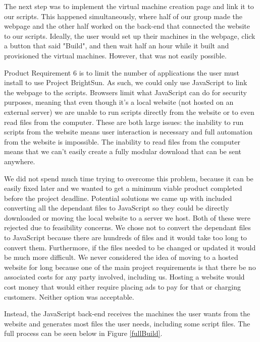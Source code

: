 \documentclass[openright]{report}
\begin{document}
\par The next step was to implement the virtual machine creation page and link it to our scripts. This happened simultaneously, where half of our group made the webpage and the other half worked on the back-end that connected the website to our scripts. Ideally, the user would set up their machines in the webpage, click a button that said "Build", and then wait half an hour while it built and provisioned the virtual machines. However, that was not easily possible.

\par Product Requirement 6 is to limit the number of applications the user must install to use Project BrightSun. As such, we could only use JavaScript to link the webpage to the scripts. Browsers limit what JavaScript can do for security purposes, meaning that even though it's a local website (not hosted on an external server) we are unable to run scripts directly from the website or to even read files from the computer. These are both large issues: the inability to run scripts from the website means user interaction is necessary and full automation from the website is impossible. The inability to read files from the computer means that we can't easily create a fully modular download that can be sent anywhere.

\par We did not spend much time trying to overcome this problem, because it can be easily fixed later and we wanted to get a minimum viable product completed before the project deadline. Potential solutions we came up with included converting all the dependant files to JavaScript so they could be directly downloaded or moving the local website to a server we host. Both of these were rejected due to feasibility concerns. We chose not to convert the dependant files to JavaScript because there are hundreds of files and it would take too long to convert them. Furthermore, if the files needed to be changed or updated it would be much more difficult. We never considered the idea of moving to a hosted website for long because one of the main project requirements is that there be no associated costs for any party involved, including us. Hosting a website would cost money that would either require placing ads to pay for that or charging customers. Neither option was acceptable.

\par Instead, the JavaScript back-end receives the machines the user wants from the website and generates most files the user needs, including some script files. The full process can be seen below in Figure \ref{fullBuild}.
\end{document}

